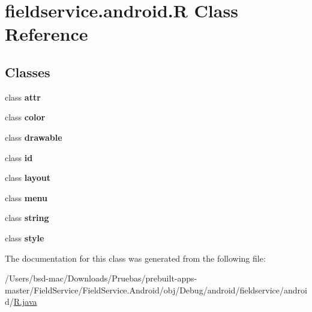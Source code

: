 \hypertarget{classfieldservice_1_1android_1_1_r}{\section{fieldservice.\+android.\+R Class Reference}
\label{classfieldservice_1_1android_1_1_r}
}
\subsection*{Classes}
\begin{DoxyCompactItemize}
\item 
class {\bfseries attr}
\item 
class {\bfseries color}
\item 
class {\bfseries drawable}
\item 
class {\bfseries id}
\item 
class {\bfseries layout}
\item 
class {\bfseries menu}
\item 
class {\bfseries string}
\item 
class {\bfseries style}
\end{DoxyCompactItemize}


The documentation for this class was generated from the following file\+:\begin{DoxyCompactItemize}
\item 
/\+Users/bsd-\/mac/\+Downloads/\+Pruebas/prebuilt-\/apps-\/master/\+Field\+Service/\+Field\+Service.\+Android/obj/\+Debug/android/fieldservice/android/\hyperlink{fieldservice_2android_2_r_8java}{R.\+java}\end{DoxyCompactItemize}
